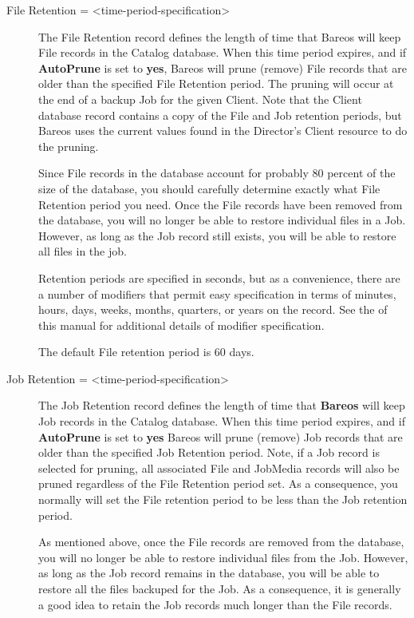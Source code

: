 \begin{description}

\item [File Retention = {\textless}time-period-specification{\textgreater}]
   The  File Retention record defines the length of time that  Bareos will keep
File records in the Catalog database.  When this time period expires, and if
{\bf AutoPrune} is set to {\bf yes}, Bareos will prune (remove) File records
that  are older than the specified File Retention period. The pruning  will
occur at the end of a backup Job for the given Client.  Note that the Client
database record contains a copy of the  File and Job retention periods, but
Bareos uses the  current values found in the Director's Client resource to  do
the pruning.

Since File records in the database account for probably 80 percent of the
size of the database, you should carefully determine exactly what File
Retention period you need. Once the File records have been removed from
the database, you will no longer be able to restore individual files
in a Job. However, as long as the
Job record still exists, you will be able to restore all files in the
job.

Retention periods are specified in seconds, but as a convenience, there are
a number of modifiers that permit easy specification in terms of minutes,
hours, days, weeks, months, quarters, or years on the record.  See the
 of this manual for additional details
of modifier specification.

The default File retention period is 60 days.

\item [Job Retention = {\textless}time-period-specification{\textgreater}]
   The Job Retention record defines the length of time that {\bf Bareos}
will keep Job records in the Catalog database.  When this time period
expires, and if {\bf AutoPrune} is set to {\bf yes} Bareos will prune
(remove) Job records that are older than the specified Job Retention
period.  Note, if a Job record is selected for pruning, all associated File
and JobMedia records will also be pruned regardless of the File Retention
period set.  As a consequence, you normally will set the File retention
period to be less than the Job retention period.

As mentioned above, once the File records are removed from the database,
you will no longer be able to restore individual files from the Job.
However, as long as the Job record remains in the database, you will be
able to restore all the files backuped for the Job.
As a consequence, it is generally a good idea to retain the Job
records much longer than the File records.


\end{description}
